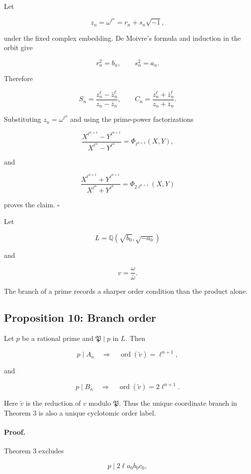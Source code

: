 \documentclass[11pt]{article}
\begin{document}
Let

\[
z_n
=
\omega^{\ell^n}
=
r_n+s_n\sqrt{-1},
\]

under the fixed complex embedding. De Moivre's formula and induction in the
orbit give

\[
r_n^2=b_n,
\qquad
s_n^2=a_n.
\]

Therefore

\[
S_n
=
\frac{z_n^\ell-\bar z_n^\ell}
{z_n-\bar z_n},
\qquad
C_n
=
\frac{z_n^\ell+\bar z_n^\ell}
{z_n+\bar z_n}.
\]

Substituting \(z_n=\omega^{\ell^n}\) and using the prime-power
factorizations

\[
\frac{
X^{\ell^{n+1}}-Y^{\ell^{n+1}}
}{
X^{\ell^n}-Y^{\ell^n}
}
=
\Phi_{\ell^{n+1}}(X,Y),
\]

and

\[
\frac{
X^{\ell^{n+1}}+Y^{\ell^{n+1}}
}{
X^{\ell^n}+Y^{\ell^n}
}
=
\Phi_{2\ell^{n+1}}(X,Y)
\]

proves the claim. \(\square\)

Let

\[
L
=
\mathbb{Q}(\sqrt{b_0},\sqrt{-a_0})
\]

and

\[
v=\frac{\omega}{\bar\omega}.
\]

The branch of a prime records a sharper order condition than the product
alone.

\subsection{Proposition 10: Branch order}

Let \(p\) be a rational prime and \(\mathfrak P\mid p\) in \(L\). Then

\[
p\mid A_n
\quad\Longrightarrow\quad
\operatorname{ord}(\widetilde v)
=
\ell^{n+1},
\]

and

\[
p\mid B_n
\quad\Longrightarrow\quad
\operatorname{ord}(\widetilde v)
=
2\ell^{n+1}.
\]

Here \(\widetilde v\) is the reduction of \(v\) modulo \(\mathfrak P\).
Thus the unique coordinate branch in Theorem 3 is also a unique
cyclotomic order label.

\paragraph{Proof.}

Theorem 3 excludes

\[
p\mid2\ell a_0b_0c_0,
\]
\end{document}
